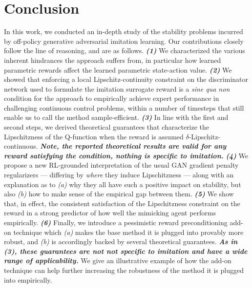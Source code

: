 \section{Conclusion}

In this work, we conducted an in-depth study of the stability problems
incurred by off-policy generative adversarial imitation learning.
Our contributions closely follow the line of reasoning, and are as follows.
\textbf{\textit{(1)}}
We characterized the various inherent hindrances the approach suffers from,
in particular how learned parametric rewards affect the learned parametric state-action value.
\textbf{\textit{(2)}}
We showed that enforcing a local Lipschitz-continuity
constraint on the discriminator network used to formulate the imitation surrogate reward
is a \textit{sine qua non} condition for the approach
to empirically achieve expert performance
in challenging continuous control problems, within a number of timesteps that still enable
us to call the method sample-efficient.
\textbf{\textit{(3)}}
In line with the first and second steps,
we derived theoretical guarantees that characterize
the Lipschitzness of the Q-function
when the reward is assumed $\delta$-Lipschitz-continuous.
\textbf{\emph{Note, the reported theoretical results are valid for any reward
satisfying the condition, nothing is specific to imitation.}}
\textbf{\textit{(4)}}
We propose a new RL-grounded interpretation of the usual
GAN gradient penalty regularizers --- differing by
\emph{where} they induce Lipschitzness --- along with an explanation
as to \textit{(a)} why they all have such a positive impact on stability,
but also \textit{(b)} how to make sense of the empirical gap between them.
\textbf{\textit{(5)}}
We show that, in effect,
the consistent satisfaction of the Lipschitzness constraint on the reward
in a strong predictor of how well the mimicking agent performs empirically.
\textbf{\textit{(6)}}
Finally, we introduce a pessimistic reward preconditioning add-on technique which
\textit{(a)} makes the base method it is plugged into provably more robust,
and \textit{(b)} is accordingly backed by several theoretical guarantees.
\textbf{\emph{As in (3), these guarantees
are not not specific to imitation and have a wide range of applicability.}}
We give an illustrative example of how the add-on technique can help further increasing
the robustness of the method it is plugged into empirically.
